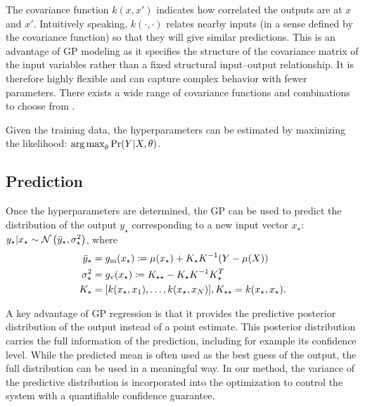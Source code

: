 The covariance function \(k(x,x')\) indicates how correlated the outputs are at \(x\) and \(x'\).
Intuitively speaking,  \(k(\cdot, \cdot)\) relates nearby inputs (in a sense defined by the covariance function) so that they will give similar predictions. 
This is an advantage of GP modeling as it specifies the structure of the covariance matrix of the input variables rather than a fixed structural input--output relationship.
It is therefore highly flexible and can capture complex behavior with fewer parameters.
There exists a wide range of covariance functions and combinations to choose from \cite{rasmussen06gaussian}. 

Given the training data, the hyperparameters can be estimated by maximizing the likelihood: \(\operatorname*{arg\,max}_\theta \Pr(Y \vert X, \theta)\).

\subsection{Prediction}
Once the hyperparameters are determined, the GP can be used to predict the distribution of the output \(y_\star\) corresponding to a new input vector \(x_\star\): \(y_\star | x_\star \sim \operatorname*{\mathcal{N}}\left(\bar{y}_\star, \sigma_\star^2\right)\), where
\begin{subequations}
\label{E:gp-regression}
\begin{align}
\bar{y}_\star &= g_{\mathrm{m}} (x_{\star}) \coloneqq \mu(x_\star) + K_\star K^{-1} (Y - \mu(X))\\
\sigma_\star^2 &= g_{\mathrm{v}} (x_{\star}) \coloneqq K_{\star \star} - K_\star K^{-1} K_\star^T\\
K_\star &= [k(x_\star, x_1), \dots, k(x_\star, x_N)], K_{\star \star} = k(x_\star, x_\star) \text.
\end{align}
\end{subequations}

A key advantage of GP regression is that it provides the predictive posterior distribution of the output instead of a point estimate.
This posterior distribution carries the full information of the prediction, including for example its confidence level.
While the predicted mean is often used as the best guess of the output, the full distribution can be used in a meaningful way.
In our method, the variance of the predictive distribution is incorporated into the optimization to control the system with a quantifiable confidence guarantee.


